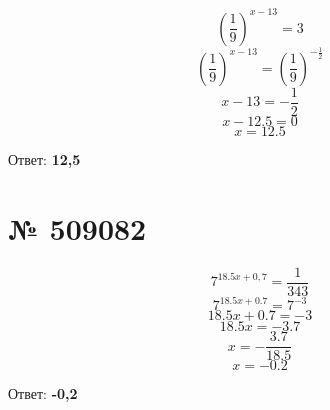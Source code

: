 \documentclass[11pt]{article} %
\begin{document}
$$(\frac{1}{9})^{x - 13} = 3$$
$$(\frac{1}{9})^{x - 13} = (\frac{1}{9})^{-\frac{1}{2}}$$
$$x - 13 = -\frac{1}{2}$$
$$x - 12.5 = 0$$
$$x = 12.5$$

Ответ: \textbf{12,5}

\section{№ \textbf{509082}}

$$7^{18.5x + 0,7} = \frac{1}{343}$$
$$7^{18.5x + 0.7} = 7^{-3}$$
$$18.5x + 0.7 = -3$$
$$18.5x = -3.7$$
$$x = -\frac{3.7}{18.5}$$
$$x = -0.2$$

Ответ: \textbf{-0,2}
\end{document}
